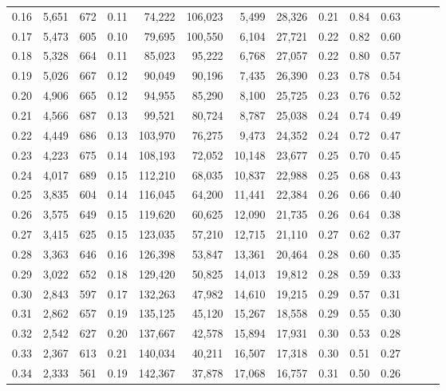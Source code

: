 \begin{tabular}{rrrrrrrrrrrrrr}
0.16 &  5,651 &  672 &  0.11 &   74,222 &  106,023 &   5,499 &  28,326 &  0.21 &  0.84 &      0.63 \\
0.17 &  5,473 &  605 &  0.10 &   79,695 &  100,550 &   6,104 &  27,721 &  0.22 &  0.82 &      0.60 \\
0.18 &  5,328 &  664 &  0.11 &   85,023 &   95,222 &   6,768 &  27,057 &  0.22 &  0.80 &      0.57 \\
0.19 &  5,026 &  667 &  0.12 &   90,049 &   90,196 &   7,435 &  26,390 &  0.23 &  0.78 &      0.54 \\
0.20 &  4,906 &  665 &  0.12 &   94,955 &   85,290 &   8,100 &  25,725 &  0.23 &  0.76 &      0.52 \\
0.21 &  4,566 &  687 &  0.13 &   99,521 &   80,724 &   8,787 &  25,038 &  0.24 &  0.74 &      0.49 \\
0.22 &  4,449 &  686 &  0.13 &  103,970 &   76,275 &   9,473 &  24,352 &  0.24 &  0.72 &      0.47 \\
0.23 &  4,223 &  675 &  0.14 &  108,193 &   72,052 &  10,148 &  23,677 &  0.25 &  0.70 &      0.45 \\
0.24 &  4,017 &  689 &  0.15 &  112,210 &   68,035 &  10,837 &  22,988 &  0.25 &  0.68 &      0.43 \\
0.25 &  3,835 &  604 &  0.14 &  116,045 &   64,200 &  11,441 &  22,384 &  0.26 &  0.66 &      0.40 \\
0.26 &  3,575 &  649 &  0.15 &  119,620 &   60,625 &  12,090 &  21,735 &  0.26 &  0.64 &      0.38 \\
0.27 &  3,415 &  625 &  0.15 &  123,035 &   57,210 &  12,715 &  21,110 &  0.27 &  0.62 &      0.37 \\
0.28 &  3,363 &  646 &  0.16 &  126,398 &   53,847 &  13,361 &  20,464 &  0.28 &  0.60 &      0.35 \\
0.29 &  3,022 &  652 &  0.18 &  129,420 &   50,825 &  14,013 &  19,812 &  0.28 &  0.59 &      0.33 \\
0.30 &  2,843 &  597 &  0.17 &  132,263 &   47,982 &  14,610 &  19,215 &  0.29 &  0.57 &      0.31 \\
0.31 &  2,862 &  657 &  0.19 &  135,125 &   45,120 &  15,267 &  18,558 &  0.29 &  0.55 &      0.30 \\
0.32 &  2,542 &  627 &  0.20 &  137,667 &   42,578 &  15,894 &  17,931 &  0.30 &  0.53 &      0.28 \\
0.33 &  2,367 &  613 &  0.21 &  140,034 &   40,211 &  16,507 &  17,318 &  0.30 &  0.51 &      0.27 \\
0.34 &  2,333 &  561 &  0.19 &  142,367 &   37,878 &  17,068 &  16,757 &  0.31 &  0.50 &      0.26 \\

\end{tabular}
